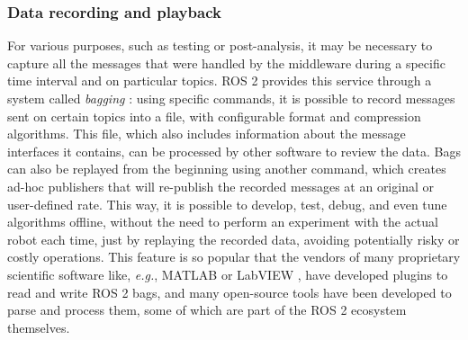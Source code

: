 \subsubsection{Data recording and playback}
\label{sec:ros2_bags}
For various purposes, such as testing or post-analysis, it may be necessary to capture all the messages that were handled by the middleware during a specific time interval and on particular topics. ROS 2 provides this service through a system called \emph{bagging} \cite{open_robotics_recording_nodate}: using specific commands, it is possible to record messages sent on certain topics into a file, with configurable format and compression algorithms. This file, which also includes information about the message interfaces it contains, can be processed by other software to review the data. Bags can also be replayed from the beginning using another command, which creates ad-hoc publishers that will re-publish the recorded messages at an original or user-defined rate. This way, it is possible to develop, test, debug, and even tune algorithms offline, without the need to perform an experiment with the actual robot each time, just by replaying the recorded data, avoiding potentially risky or costly operations. This feature is so popular that the vendors of many proprietary scientific software like, \emph{e.g.}, MATLAB \cite{mathworks_matlab_nodate} or LabVIEW \cite{national_instruments_labview_nodate}, have developed plugins to read and write ROS 2 bags, and many open-source tools have been developed to parse and process them, some of which are part of the ROS 2 ecosystem themselves.

